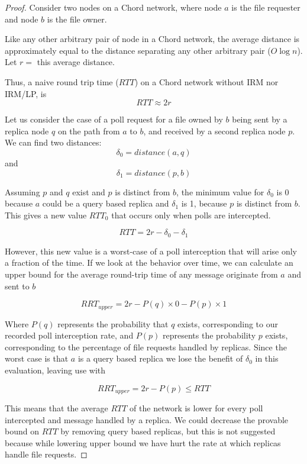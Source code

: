 \documentclass[10pt, conference, compsocconf, letterpaper]{IEEEtran} %
\begin{document}
\begin{proof}
Consider two nodes on a Chord network, where node $a$ is the file requester and node $b$ is the file owner.  

Like any other arbitrary pair of node in a Chord network, the average distance is approximately equal to the distance separating any other arbitrary pair ($O\log n$).  Let $r =$ this average distance.

Thus, a naive round trip time ($RTT$) on a Chord network without IRM nor IRM/LP, is 
$$RTT \approx 2r$$

Let us consider the case of a poll request for a file owned by $b$ being sent by a replica node $q$ on the path from $a$ to $b$, and received by a second replica node $p$.  We can find two distances: $$\delta_0 = distance(a, q)$$ and $$\delta_1 = distance(p,b)$$   

Assuming  $p$ and $q$ exist and $p$ is distinct from $b$, the minimum value for $\delta_0$ is 0 because $a$ could be a query based replica and $\delta_1$ is 1, because $p$ is distinct from $b$.  This gives a new value $RTT_0$ that occurs only when polls are intercepted.

$$RTT = 2r - \delta_0 -\delta_1$$


However, this new value is a worst-case of a poll interception that will arise only a fraction of the time.  If we look at the behavior over time, we can  calculate an upper bound for the average round-trip time of any message originate from $a$ and sent to $b$

$$RRT_{upper}= 2r - P(q)\times0 - P(p)\times1$$ 

Where $P(q)$ represents the probability that $q$ exists, corresponding to our recorded poll interception rate, and $P(p)$ represents the probability $p$ exists, corresponding to the percentage of file requests handled by replicas. Since the worst case is that $a$ is a query based replica we lose the benefit of $\delta_0$ in this evaluation, leaving use with

$$RRT_{upper}= 2r - P(p) \leq RTT $$

This means that the average $RTT$ of the network is lower for every poll intercepted and message handled by a replica. We could decrease the provable bound on $RTT$ by removing query based replicas, but this is not suggested because while lowering upper bound we have hurt the rate at which replicas handle file requests.
\end{proof}

\end{document}
